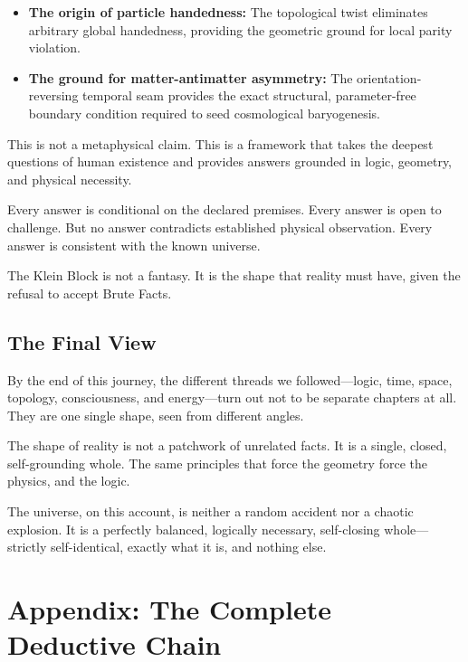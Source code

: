 \documentclass[11pt]{article}
\theoremstyle{canonstyle}
\begin{document}
\begin{realization}
\begin{itemize}
    \item \textbf{The origin of particle handedness:} The topological twist eliminates arbitrary global handedness, providing the geometric ground for local parity violation.
    \item \textbf{The ground for matter-antimatter asymmetry:} The orientation-reversing temporal seam provides the exact structural, parameter-free boundary condition required to seed cosmological baryogenesis.
\end{itemize}

\medskip

This is not a metaphysical claim. This is a framework that takes the deepest questions of human existence and provides answers grounded in logic, geometry, and physical necessity.

Every answer is conditional on the declared premises. Every answer is open to challenge. But no answer contradicts established physical observation. Every answer is consistent with the known universe.

The Klein Block is not a fantasy. It is the shape that reality must have, given the refusal to accept Brute Facts.
\end{realization}

\subsection{The Final View}

By the end of this journey, the different threads we followed---logic, time, space, topology, consciousness, and energy---turn out not to be separate chapters at all. They are one single shape, seen from different angles. 

The shape of reality is not a patchwork of unrelated facts. It is a single, closed, self-grounding whole. The same principles that force the geometry force the physics, and the logic.

The universe, on this account, is neither a random accident nor a chaotic explosion. It is a perfectly balanced, logically necessary, self-closing whole---strictly self-identical, exactly what it is, and nothing else.

{}
\section*{Appendix: The Complete Deductive Chain}
\end{document}

